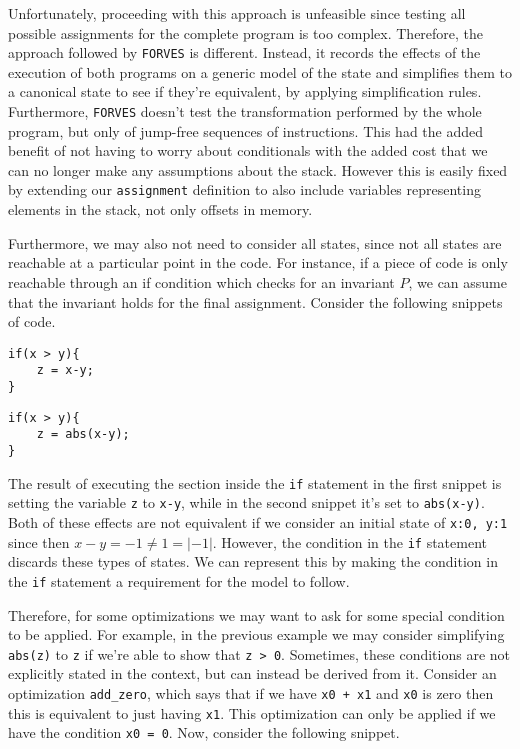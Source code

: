 Unfortunately, proceeding with this approach is unfeasible since testing all possible assignments for
the complete program is too complex. Therefore, the approach followed by \verb|FORVES| is different.
Instead, it records the effects of the execution of both programs on a generic model of the state and
simplifies  them to a canonical state to see if they're equivalent, by applying simplification rules.
Furthermore, \verb|FORVES| doesn't test the transformation performed by the whole program, but only of 
jump-free sequences of instructions. This had the added benefit of not having to worry about 
conditionals with the added cost that we can no longer make any assumptions about the stack. However 
this is easily fixed by extending our \texttt{assignment} definition to also include 
variables representing elements in the stack, not only offsets in memory.

Furthermore, we may also not need to consider all states, since not all states are reachable at a 
particular point in the code. For instance, if a piece of code is only reachable through an if 
condition which checks for an invariant $P$, we can assume that the invariant holds for the final
assignment. Consider the following snippets of code.

\begin{verbatim}
if(x > y){
    z = x-y;
}
\end{verbatim}
\begin{verbatim}
if(x > y){
    z = abs(x-y);
}
\end{verbatim}

The result of executing the section inside the \texttt{if} statement in the first snippet is 
setting the variable \texttt{z} to \texttt{x-y}, while in the second snippet it's
set to \texttt{abs(x-y)}. Both of these effects are not equivalent if we consider an initial
state of \texttt{{x:0, y:1}} since then ${x-y} = -1 \ne 1 = \lvert-1\rvert$. However,
the condition in the \texttt{if} statement discards these types of states. We can represent
this by making the condition in the \texttt{if} statement a requirement for the model to 
follow.

Therefore, for some optimizations we may want to ask for some special condition to be applied.
For example, in the previous example we may consider simplifying \texttt{abs(z)} to
\texttt{z} if we're able to show that \texttt{z > 0}. Sometimes, these conditions
are not explicitly stated in the context, but can instead be derived from it. Consider an optimization
\texttt{add_zero}, which says that if we have \texttt{x0 + x1} and 
\texttt{x0} is zero then this is equivalent to just having \texttt{x1}. This 
optimization can only be applied if we have the condition \texttt{x0 = 0}. Now, consider the
following snippet.

